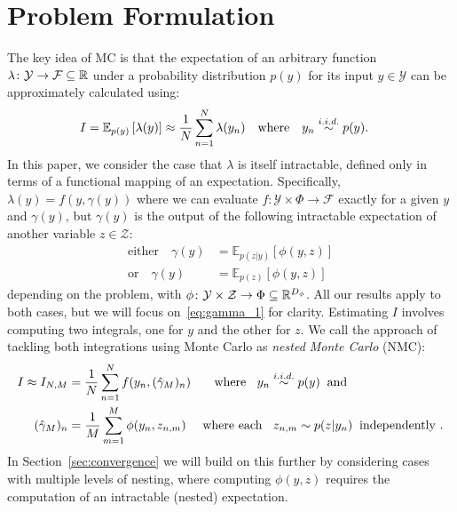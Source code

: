 
\section{Problem Formulation}
\label{sec:prob-form}

The key idea of MC is that the expectation of an arbitrary function 
$\lambda \colon \mathcal{Y} \rightarrow \mathcal{F} \subseteq \mathbb{R}$ under a probability distribution $p(y)$ for its input $y \in \mathcal{Y}$ can be approximately calculated using:
\begin{align}
\label{eq:MC}
I &= \mathbb{E}_{p(y)} \left[\lambda(y)\right]
\approx \frac{1}{N} \sum_{n=1}^{N} \lambda(y_n) \quad \text{where} \quad y_n \overset{i.i.d.}{\sim} p(y).
\end{align}
In this paper, we consider the case that $\lambda$ is itself intractable, defined only in terms of a functional mapping of an expectation. Specifically, $\lambda(y) = f(y,\gamma(y))$
where we can evaluate $f \colon \mathcal{Y} \times \Phi \rightarrow \mathcal{F}$ exactly for a given $y$ and $\gamma (y)$, but $\gamma(y)$ is the output of the following 
intractable expectation of another variable $z \in \mathcal{Z}$:
\begin{subequations}
	\label{eq:gamma}
	\begin{align}
	\label{eq:gamma_1}
	\text{either}\quad
	\gamma(y) &=  \mathbb{E}_{p(z | y)} \left[\phi(y,z)\right] \\
	\label{eq:gamma_2}
	\text{or} \quad \gamma(y) &= \mathbb{E}_{p(z)} \left[\phi(y,z)\right]
	\end{align}
\end{subequations}
depending on the problem, with $\phi \colon \mathcal{Y} \times \mathcal{Z} \rightarrow \Phi \subseteq \mathbb{R}^{D_{\phi}}$.
All our results apply to both cases, but we will focus on~\eqref{eq:gamma_1} for clarity.
Estimating $I$ involves computing two integrals, one for $y$ and the other for $z$. 
We call the approach of tackling both integrations using Monte Carlo 
as \emph{nested Monte Carlo} (NMC):
\begin{subequations}
\label{eq:nested-mc}
\begin{align}
I \approx I_{N,M} &= \frac{1}{N}  \sum_{n=1}^{N} f(y_n,(\hat{\gamma}_M)_n) \label{eq:nested-outer} \quad \;\;  \text{ where } \;\; y_n \overset{i.i.d.}{\sim} p(y) \;\;  \text{and} \\
(\hat{\gamma}_M)_n &= \frac{1}{M}  \sum_{m=1}^{M}  \phi(y_n,z_{n,m}) \label{eq:nested-inner} \quad
\text{ where each } \;\; z_{n,m} \sim p(z | y_n) \;\; \text{independently }.
\end{align}
\end{subequations}
In Section~\ref{sec:convergence} we will build on this further by considering cases with multiple
levels of nesting, where computing $\phi(y,z)$ requires the computation of an intractable (nested) expectation.

